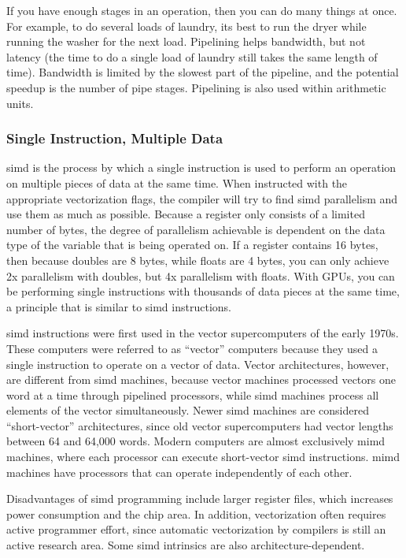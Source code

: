 \documentclass[10pt]{article}
\begin{document}
\begin{flushleft}
If you have enough stages in an operation, then you can do many things at once. For example, to do several loads of laundry, its best to run the dryer while running the washer for the next load. Pipelining helps bandwidth, but not latency (the time to do a single load of laundry still takes the same length of time). Bandwidth is limited by the slowest part of the pipeline, and the potential speedup is the number of pipe stages. Pipelining is also used within arithmetic units. 

\subsubsection{Single Instruction, Multiple Data}

\gls{simd} is the process by which a single instruction is used to perform an operation on multiple pieces of data at the same time. When instructed with the appropriate vectorization flags, the compiler will try to find \gls{simd} parallelism and use them as much as possible. Because a register only consists of a limited number of bytes, the degree of parallelism achievable is dependent on the data type of the variable that is being operated on. If a register contains 16 bytes, then because doubles are 8 bytes, while floats are 4 bytes, you can only achieve 2x parallelism with doubles, but 4x parallelism with floats. With GPUs, you can be performing single instructions with thousands of data pieces at the same time, a principle that is similar to \gls{simd} instructions. 

\gls{simd} instructions were first used in the vector supercomputers of the early 1970s. These computers were referred to as ``vector'' computers because they used a single instruction to operate on a vector of data. Vector architectures, however, are different from \gls{simd} machines, because vector machines processed vectors one word at a time through pipelined processors, while \gls{simd} machines process all elements of the vector simultaneously. Newer \gls{simd} machines are considered ``short-vector'' architectures, since old vector supercomputers had vector lengths between 64 and 64,000 words. Modern computers are almost exclusively \gls{mimd} machines, where each processor can execute short-vector \gls{simd} instructions. \gls{mimd} machines have processors that can operate independently of each other. 

Disadvantages of \gls{simd} programming include larger register files, which increases power consumption and the chip area. In addition, vectorization often requires active programmer effort, since automatic vectorization by compilers is still an active research area. Some \gls{simd} intrinsics are also architecture-dependent. 


\end{flushleft}
\end{document}
